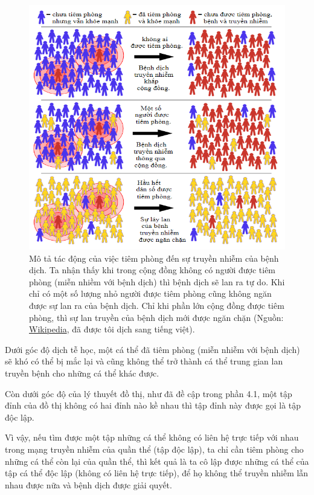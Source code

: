 \documentclass[14pt, oneside, a4paper, openany]{scrartcl}
\begin{document}
\begin{figure}[!h]
	\centering
	\includegraphics[scale=0.8]{figures/Herd_immunity_vn_2.png} 
	\caption[Mô tả tác động của việc tiêm phòng đến sự truyền nhiễm của bệnh dịch]{Mô tả tác động của việc tiêm phòng đến sự truyền nhiễm của bệnh dịch. Ta nhận thấy khi trong cộng đồng không có người được tiêm phòng (miễn nhiềm với bệnh dịch) thì bệnh dịch sẽ lan ra tự do. Khi chỉ có một số lượng nhỏ người được tiêm phòng cũng không ngăn được sự lan ra của bệnh dịch. Chỉ khi phần lớn cộng đồng được tiêm phòng, thì sự lan truyền của bệnh dịch mới được ngăn chặn (Nguồn: \href{https://en.wikipedia.org/wiki/Herd\_immunity}{Wikipedia}, đã được tôi dịch sang tiếng việt).}
	\label{fig:epidemiology}
\end{figure}

Dưới góc độ dịch tễ học, một cá thể đã tiêm phòng (miễn nhiễm với bệnh dịch) sẽ khó có thể bị mắc lại và cũng không thể trở thành cá thể trung gian lan truyền bệnh cho những cá thể khác được. 

Còn dưới góc độ của lý thuyết đồ thị, như đã đề cập trong phần 4.1, một tập đỉnh của đồ thị không có hai đỉnh nào kề nhau thì tập đỉnh này được gọi là tập độc lập. 

Vì vậy, nếu tìm được một tập những cá thể không có liên hệ trực tiếp với nhau trong mạng truyền nhiễm của quần thể (tập độc lập), ta chỉ cần tiêm phòng cho những cá thể còn lại của quần thể, thì kết quả là ta cô lập được những cá thể của tập cá thể độc lập (không có liên hệ trực tiếp), để họ không thể truyền nhiễm lẫn nhau được nữa và bệnh dịch được giải quyết.
\end{document}
